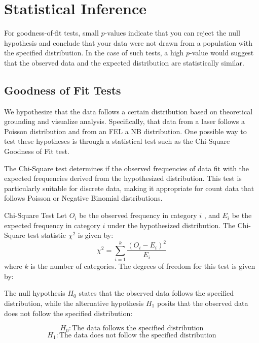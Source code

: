 \section{Statistical Inference}
For goodness-of-fit tests, small $p$-values indicate that you can reject the null hypothesis and conclude that your data were not drawn from a population with the specified distribution. In the case of such tests, a high $p$-value would suggest that the observed data and the expected distribution are statistically similar.
\subsection*{Goodness of Fit Tests}\label{section:chi-test}
We hypothesize that the data follows a certain distribution based on theoretical grounding and visualize analysis. Specifically, that data from a laser follows a Poisson distribution and from an \gls{FEL} a \gls{NB} distribution. One possible way to test these hypotheses is through a statistical test such as the Chi-Square Goodness of Fit test.

The Chi-Square test determines if the observed frequencies of data fit with the expected frequencies derived from the hypothesized distribution. This test is particularly suitable for discrete data, making it appropriate for count data that follows Poisson or Negative Binomial distributions.

\begin{note}
    {Chi-Square Test}
    Let  $O_i$  be the observed frequency in category  $i$ , and  $E_i$  be the expected frequency in category  $i$  under the hypothesized distribution. The Chi-Square test statistic  $\chi^2 $ is given by:
    \begin{equation}
        \chi^2 = \sum_{i=1}^k \frac{(O_i - E_i)^2}{E_i}
    \end{equation}
    where $k$ is the number of categories. The degrees of freedom for this test is given by:

    The null hypothesis $H_0$ states that the observed data follows the specified distribution, while the alternative hypothesis $H_1$ posits that the observed data does not follow the specified distribution:

    \begin{equation*}
        H_0: \text{The data follows the specified distribution}
    \end{equation*}
    \begin{equation*}
        H_1: \text{The data does not follow the specified distribution}
    \end{equation*}
\end{note}

